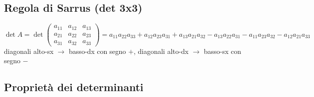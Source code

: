 \documentclass[a4paper]{article}
\begin{document}
\subsection{Regola di Sarrus (det 3x3)}
\[\det A = \det \left( \begin{matrix}
	a_{11} & a_{12} & a_{13} \\
	a_{21} & a_{22} & a_{23} \\
	a_{31} & a_{32} & a_{33}
\end{matrix} \right) = a_{11} a_{22} a_{33} + a_{12} a_{23} a_{31} + a_{13} a_{21} a_{32} - a_{13} a_{22} a_{31} - a_{11} a_{23} a_{32} - a_{12} a_{21} a_{33}\]
diagonali alto-sx \(\to\) basso-dx con segno \(+\), diagonali alto-dx \(\to\) basso-sx con segno \(-\)

\subsection{Proprietà dei determinanti}
\end{document}
